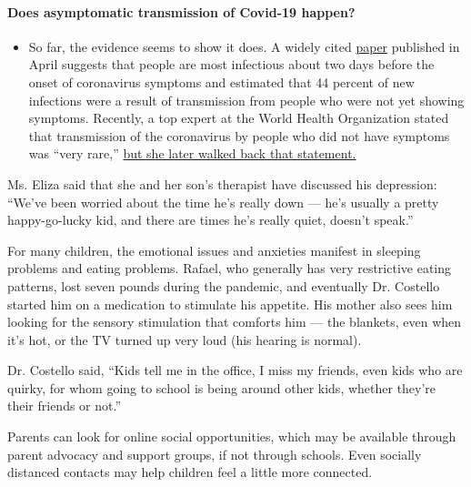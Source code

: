 \begin{itemize}
{  \paragraph{Does asymptomatic transmission of Covid-19
  happen?}\label{does-asymptomatic-transmission-of-covid-19-happen}}

  \begin{itemize}
  \tightlist
  \item
    So far, the evidence seems to show it does. A widely cited
    \href{https://www.nature.com/articles/s41591-020-0869-5}{paper}
    published in April suggests that people are most infectious about
    two days before the onset of coronavirus symptoms and estimated that
    44 percent of new infections were a result of transmission from
    people who were not yet showing symptoms. Recently, a top expert at
    the World Health Organization stated that transmission of the
    coronavirus by people who did not have symptoms was ``very rare,''
    \href{https://www.nytimes3xbfgragh.onion/2020/06/09/world/coronavirus-updates.html?action=click\&pgtype=Article\&state=default\&region=MAIN_CONTENT_3\&context=storylines_faq\#link-1f302e21}{but
    she later walked back that statement.}
  \end{itemize}
\end{itemize}

Ms. Eliza said that she and her son's therapist have discussed his
depression: ``We've been worried about the time he's really down ---
he's usually a pretty happy-go-lucky kid, and there are times he's
really quiet, doesn't speak.''

For many children, the emotional issues and anxieties manifest in
sleeping problems and eating problems. Rafael, who generally has very
restrictive eating patterns, lost seven pounds during the pandemic, and
eventually Dr. Costello started him on a medication to stimulate his
appetite. His mother also sees him looking for the sensory stimulation
that comforts him --- the blankets, even when it's hot, or the TV turned
up very loud (his hearing is normal).

Dr. Costello said, ``Kids tell me in the office, I miss my friends, even
kids who are quirky, for whom going to school is being around other
kids, whether they're their friends or not.''

Parents can look for online social opportunities, which may be available
through parent advocacy and support groups, if not through schools. Even
socially distanced contacts may help children feel a little more
connected.

